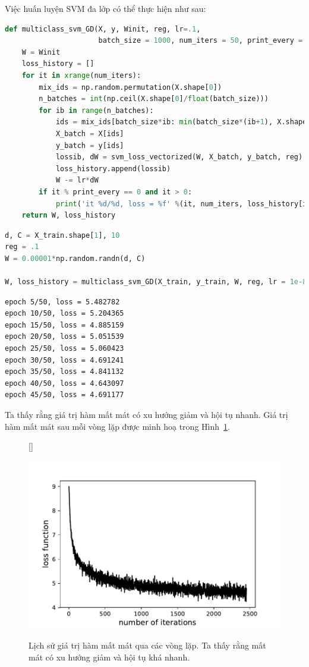 Việc huấn luyện SVM đa lớp có thể thực hiện như sau:
\begin{lstlisting}[language=Python]
def multiclass_svm_GD(X, y, Winit, reg, lr=.1,
                      batch_size = 1000, num_iters = 50, print_every = 10):
    W = Winit
    loss_history = []
    for it in xrange(num_iters):
        mix_ids = np.random.permutation(X.shape[0])
        n_batches = int(np.ceil(X.shape[0]/float(batch_size)))
        for ib in range(n_batches):
            ids = mix_ids[batch_size*ib: min(batch_size*(ib+1), X.shape[0])]
            X_batch = X[ids]
            y_batch = y[ids]
            lossib, dW = svm_loss_vectorized(W, X_batch, y_batch, reg)
            loss_history.append(lossib)
            W -= lr*dW
        if it % print_every == 0 and it > 0:
            print('it %d/%d, loss = %f' %(it, num_iters, loss_history[it]))
    return W, loss_history
\end{lstlisting}
\begin{lstlisting}[language=Python]
d, C = X_train.shape[1], 10
reg = .1
W = 0.00001*np.random.randn(d, C)

W, loss_history = multiclass_svm_GD(X_train, y_train, W, reg, lr = 1e-8, num_iters = 50, print_every = 5)
\end{lstlisting}
\kq
\begin{lstlisting}
epoch 5/50, loss = 5.482782
epoch 10/50, loss = 5.204365
epoch 15/50, loss = 4.885159
epoch 20/50, loss = 5.051539
epoch 25/50, loss = 5.060423
epoch 30/50, loss = 4.691241
epoch 35/50, loss = 4.841132
epoch 40/50, loss = 4.643097
epoch 45/50, loss = 4.691177
\end{lstlisting}
Ta thấy rằng giá trị hàm mất mát có xu hướng giảm và hội tụ nhanh. Giá trị hàm mất mát sau mỗi vòng lặp được minh hoạ trong Hình~\ref{fig:22_8}.
\begin{figure}[t]

[\FBwidth]
{\caption{
Lịch sử giá trị hàm mất mát qua các vòng lặp. Ta thấy rằng mất mát có xu hướng giảm và hội tụ khá nhanh.
}
\label{fig:22_8}}
{ %
\includegraphics[width=.65\textwidth]{ebookML_src/src/multiclasssvm/loss_history.pdf}
}
\end{figure}

